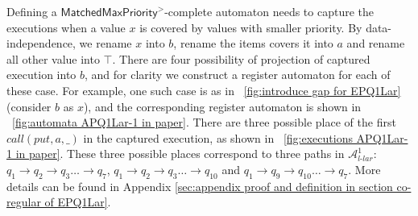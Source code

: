 {\color {blue} 
Defining a $\mathsf{MatchedMaxPriority}^>$-complete automaton needs to capture the executions when a value $x$ is covered by values with smaller priority. By data-independence, we rename $x$ into $b$, rename the items covers it into $a$ and rename all other value into $\top$. There are four possibility of projection of captured execution into $b$, and for clarity we construct a register automaton for each of these case. For example, one such case is as in \figurename~\ref{fig:introduce gap for EPQ1Lar} (consider $b$ as $x$), and the corresponding register automaton is shown in \figurename~\ref{fig:automata APQ1Lar-1 in paper}. There are three possible place of the first $\textit{call}(\textit{put},a,\_)$ in the captured execution, as shown in \figurename~\ref{fig:executions APQ1Lar-1 in paper}. These three possible places correspond to three paths in $\mathcal{A}_{\textit{l-lar}}^1$: $q_1 \rightarrow q_2 \rightarrow q_3 \ldots \rightarrow q_7$, $q_1 \rightarrow q_2 \rightarrow q_3 \ldots \rightarrow q_{10}$ and $q_1 \rightarrow q_9 \rightarrow q_{10} \ldots \rightarrow q_7$. More details can be found in Appendix \ref{sec:appendix proof and definition in section co-regular of EPQ1Lar}. 
}

